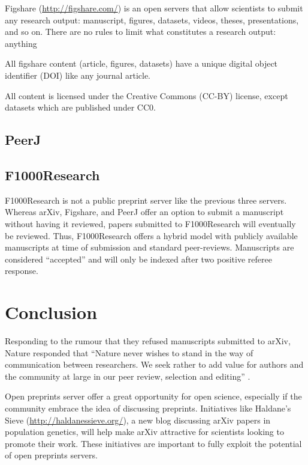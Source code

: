 \documentclass[letterpaper,twocolumn,superscriptaddress,showkeys]{revtex4}
\begin{document}

Figshare (\href{http://figshare.com/}{http://figshare.com/}) is an open servers
that allow scientists to submit any research output: manuscript, figures,
datasets, videos, theses, presentations, and so on. There are no rules to limit
what constitutes a research output: anything

All figshare content (article, figures, datasets) have a unique digital object
identifier (DOI) like any journal article.

All content is licensed under the Creative Commons (CC-BY) license, except
datasets which are published under CC0.

\subsection{PeerJ}


\subsection{F1000Research}


F1000Research is not a public preprint server like the previous three servers.
Whereas arXiv, Figshare, and PeerJ offer an option to submit a manuscript
without having it reviewed, papers submitted to F1000Research will eventually be
reviewed. Thus, F1000Research offers a hybrid model with publicly available
manuscripts at time of submission and standard peer-reviews. Manuscripts are
considered ``accepted'' and will only be indexed after two positive referee
response.

\section{Conclusion}

Responding to the rumour that they refused manuscripts submitted to arXiv,
Nature responded that ``Nature never wishes to stand in the way of communication
between researchers. We seek rather to add value for authors and the community
at large in our peer review, selection and editing'' \cite{nat05}.

Open preprints server offer a great opportunity for open science, especially if
the community embrace the idea of discussing preprints. Initiatives like
Haldane's Sieve (\href{http://haldanessieve.org/}{http://haldanessieve.org/}), a
new blog discussing arXiv papers in population genetics, will help make arXiv
attractive for scientists looking to promote their work. These initiatives are
important to fully exploit the potential of open preprints servers.

\newpage


\end{document}
